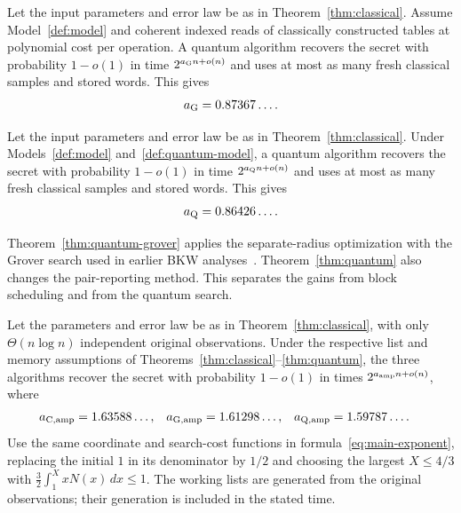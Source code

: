 \documentclass[runningheads,envcountsame,envcountsect,orivec]{llncs}
\begin{document}
\begin{samepage}
\begin{theorem}
\label{thm:quantum-grover}
Let the input parameters and error law be as in
Theorem~\ref{thm:classical}. Assume Model~\ref{def:model} and
coherent indexed reads of classically constructed tables at
polynomial cost per operation. A quantum algorithm recovers
the secret with probability $1-o(1)$ in time
$2^{a_{\rm G}n+o(n)}$ and uses at most as many fresh classical
samples and stored words.
This gives
\begin{align}
 a_{\rm G}=0.87367\ldots .
 \label{eq:grover-main}
\end{align}
\end{theorem}
\end{samepage}

\begin{theorem}
\label{thm:quantum}
Let the input parameters and error law be as in
Theorem~\ref{thm:classical}. Under Models~\ref{def:model}
and~\ref{def:quantum-model}, a quantum algorithm recovers
the secret with probability $1-o(1)$ in time
$2^{a_{\rm Q}n+o(n)}$ and uses at most as many fresh classical
samples and stored words.
This gives
\begin{align}
 a_{\rm Q}=0.86426\ldots .
 \label{eq:q-main}
\end{align}
\end{theorem}

Theorem~\ref{thm:quantum-grover} applies the separate-radius
optimization with the Grover search used in earlier BKW
analyses~\cite{GJMS19,M19,Laa16}. Theorem~\ref{thm:quantum}
also changes the pair-reporting method. This separates the
gains from block scheduling and from the quantum search.

\begin{corollary}
\label{cor:amplified-regev}
Let the parameters and error law be as in Theorem~\ref{thm:classical},
with only $\Theta(n\log n)$ independent original observations.
Under the respective list and memory assumptions of
Theorems~\ref{thm:classical}--\ref{thm:quantum}, the three algorithms
recover the secret with probability $1-o(1)$ in times
$2^{a_{\rm amp}n+o(n)}$, where
\begin{align*}
 a_{{\rm C},{\rm amp}}&=1.63588\ldots,&
 a_{{\rm G},{\rm amp}}&=1.61298\ldots,&
 a_{{\rm Q},{\rm amp}}&=1.59787\ldots.
\end{align*}
Use the same coordinate and search-cost functions in
formula~\eqref{eq:main-exponent},
replacing the initial $1$ in its denominator by $1/2$ and choosing
the largest $X\le4/3$ with $\tfrac32\int_1^XxN(x)\,dx\le1$.
The working lists are generated from the original observations;
their generation is included in the stated time.
\end{corollary}
\end{document}

